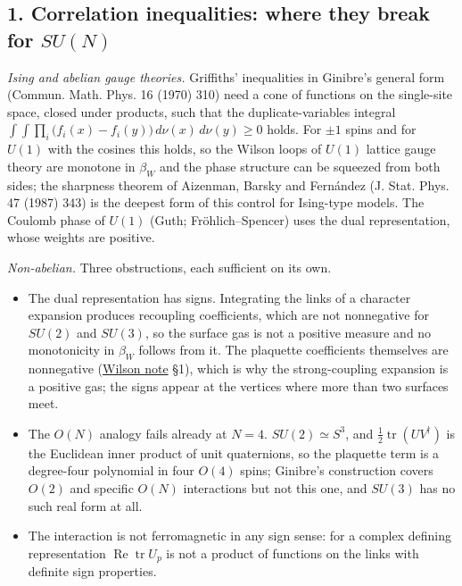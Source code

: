 \documentclass[11pt,a4paper]{article}
\newcommand{\tightlist}{\setlength{\itemsep}{0pt}\setlength{\parskip}{0pt}}
\begin{document}
\hypertarget{correlation-inequalities-where-they-break-for-sun}{%
\subsection{\texorpdfstring{1. Correlation inequalities: where they
break for
\(SU(N)\)}{1. Correlation inequalities: where they break for SU(N)}}\label{correlation-inequalities-where-they-break-for-sun}}

\emph{Ising and abelian gauge theories.} Griffiths' inequalities in
Ginibre's general form (Commun. Math. Phys. 16 (1970) 310) need a cone
of functions on the single-site space, closed under products, such that
the duplicate-variables integral
\(\int\!\!\int\prod_i\big(f_i(x)-f_i(y)\big)\,d\nu(x)\,d\nu(y)\ge0\)
holds. For \(\pm1\) spins and for \(U(1)\) with the cosines this holds,
so the Wilson loops of \(U(1)\) lattice gauge theory are monotone in
\(\beta_W\) and the phase structure can be squeezed from both sides; the
sharpness theorem of Aizenman, Barsky and Fernández (J. Stat. Phys. 47
(1987) 343) is the deepest form of this control for Ising-type models.
The Coulomb phase of \(U(1)\) (Guth; Fröhlich--Spencer) uses the dual
representation, whose weights are positive.

\emph{Non-abelian.} Three obstructions, each sufficient on its own.

\begin{itemize}
\tightlist
\item
  The dual representation has signs. Integrating the links of a
  character expansion produces recoupling coefficients, which are not
  nonnegative for \(SU(2)\) and \(SU(3)\), so the surface gas is not a
  positive measure and no monotonicity in \(\beta_W\) follows from it.
  The plaquette coefficients themselves are nonnegative
  (\href{wilson-strong-coupling-explicit.md}{Wilson note} §1), which is
  why the strong-coupling expansion is a positive gas; the signs appear
  at the vertices where more than two surfaces meet.
\item
  The \(O(N)\) analogy fails already at \(N=4\). \(SU(2)\simeq S^3\),
  and \(\tfrac12\operatorname{tr}(UV^\dagger)\) is the Euclidean inner
  product of unit quaternions, so the plaquette term is a degree-four
  polynomial in four \(O(4)\) spins; Ginibre's construction covers
  \(O(2)\) and specific \(O(N)\) interactions but not this one, and
  \(SU(3)\) has no such real form at all.
\item
  The interaction is not ferromagnetic in any sign sense: for a complex
  defining representation \(\operatorname{Re}\operatorname{tr}U_p\) is
  not a product of functions on the links with definite sign properties.
\end{itemize}
\end{document}
